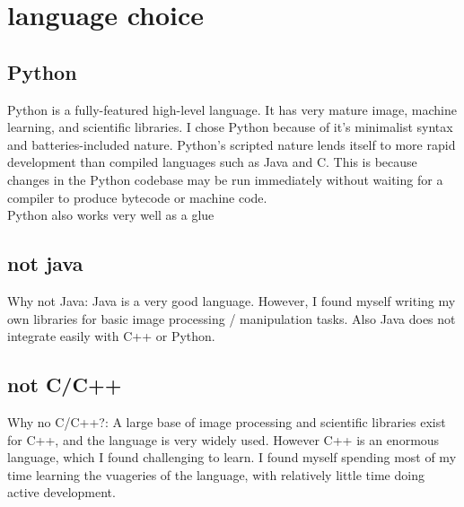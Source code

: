 \chapter{language choice}
\section{Python}
Python is a fully-featured high-level language. It has very mature image, machine learning, and scientific libraries.  I chose Python because of it's minimalist syntax and batteries-included nature.  Python's scripted nature lends itself to more rapid development than compiled languages such as Java and C. This is because changes in the Python codebase may be run immediately without waiting for a compiler to produce bytecode or machine code.\\
Python also works very well as a glue 
\section{not java}
Why not Java:  Java is a very good language. However, I found myself writing my own libraries for basic image processing / manipulation tasks.  Also Java does not integrate easily with C++ or Python.
\section{not C/C++}
Why no C/C++?:    A large base of image processing and scientific libraries exist for C++, and the language is very widely used.  However C++ is an enormous language, which I found challenging to learn. I found myself spending most of my time learning the vuageries of the language, with relatively little time doing active development.


\newpage
